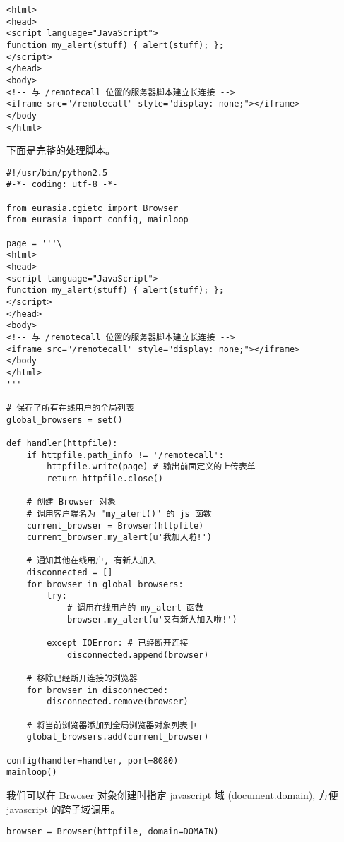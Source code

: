 \documentclass{manual}
\begin{document}
\begin{verbatim}
<html>
<head>
<script language="JavaScript">
function my_alert(stuff) { alert(stuff); };
</script>
</head>
<body>
<!-- 与 /remotecall 位置的服务器脚本建立长连接 -->
<iframe src="/remotecall" style="display: none;"></iframe>
</body
</html>
\end{verbatim}

下面是完整的处理脚本。

\begin{verbatim}
#!/usr/bin/python2.5
#-*- coding: utf-8 -*-

from eurasia.cgietc import Browser
from eurasia import config, mainloop

page = '''\
<html>
<head>
<script language="JavaScript">
function my_alert(stuff) { alert(stuff); };
</script>
</head>
<body>
<!-- 与 /remotecall 位置的服务器脚本建立长连接 -->
<iframe src="/remotecall" style="display: none;"></iframe>
</body
</html>
'''

# 保存了所有在线用户的全局列表
global_browsers = set()

def handler(httpfile):
	if httpfile.path_info != '/remotecall':
		httpfile.write(page) # 输出前面定义的上传表单
		return httpfile.close()

	# 创建 Browser 对象
	# 调用客户端名为 "my_alert()" 的 js 函数
	current_browser = Browser(httpfile)
	current_browser.my_alert(u'我加入啦!')

	# 通知其他在线用户, 有新人加入
	disconnected = []
	for browser in global_browsers:
		try:
			# 调用在线用户的 my_alert 函数
			browser.my_alert(u'又有新人加入啦!')

		except IOError: # 已经断开连接
			disconnected.append(browser)

	# 移除已经断开连接的浏览器
	for browser in disconnected:
		disconnected.remove(browser)

	# 将当前浏览器添加到全局浏览器对象列表中
	global_browsers.add(current_browser)

config(handler=handler, port=8080)
mainloop()
\end{verbatim}

我们可以在 Brwoser 对象创建时指定 javascript 域 (document.domain),
方便 javascript 的跨子域调用。

\begin{verbatim}
browser = Browser(httpfile, domain=DOMAIN)
\end{verbatim}

\end{document}
